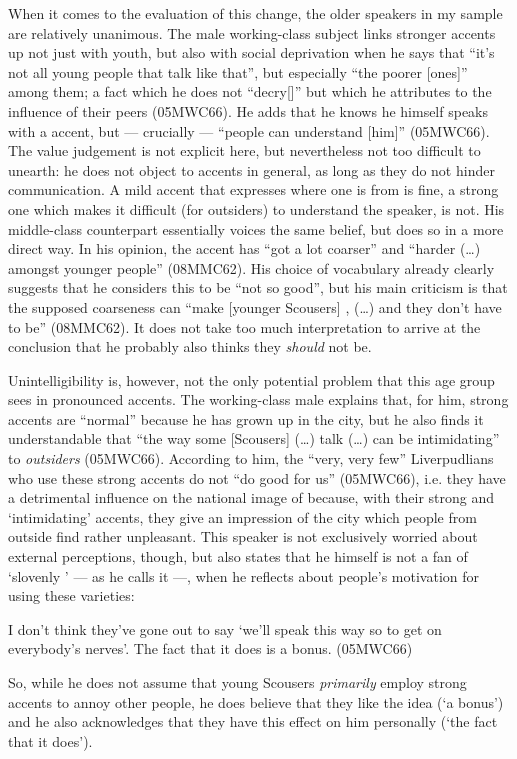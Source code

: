 When it comes to the evaluation of this change, the older speakers in my sample are relatively unanimous.
The male working-class subject links stronger accents up not just with youth, but also with social deprivation when he says that ``it's not all young people that talk like that'', but especially ``the poorer [ones]'' among them; a fact which he does not ``decry[]'' but which he attributes to the influence of their peers (05MWC66).
He adds that he knows he himself speaks with a  accent, but --- crucially --- ``people can understand [him]'' (05MWC66).
The value judgement is not explicit here, but nevertheless not too difficult to unearth: he does not object to  accents in general, as long as they do not hinder communication.
A mild accent that expresses where one is from is fine, a strong one which makes it difficult (for outsiders) to understand the speaker, is not.
His middle-class counterpart essentially voices the same belief, but does so in a more direct way.
In his opinion, the accent has ``got a lot coarser'' and ``harder (\ldots) amongst younger people'' (08MMC62).
His choice of vocabulary already clearly suggests that he considers this to be ``not so good'', but his main criticism is that the supposed coarseness can ``make [younger Scousers] , (\ldots) and they don't have to be'' (08MMC62).
It does not take too much interpretation to arrive at the conclusion that he probably also thinks they \emph{should} not be.

Unintelligibility is, however, not the only potential problem that this age group sees in pronounced  accents.
The working-class male explains that, for him, strong  accents are ``normal'' because he has grown up in the city, but he also finds it understandable that ``the way some [Scousers] (\ldots) talk (\ldots) can be intimidating'' to \emph{outsiders} (05MWC66).
According to him, the ``very, very few'' Liverpudlians who use these strong accents do not ``do good for us'' (05MWC66), i.e. they have a detrimental influence on the national image of  because, with their strong and `intimidating' accents, they give an impression of the city which people from outside find rather unpleasant.
This speaker is not exclusively worried about external perceptions, though, but also states that he himself is not a fan of `slovenly ' --- as he calls it ---, when he reflects about people's motivation for using these varieties: 
\begin{example}
	I don't think they've  gone out to say `we'll speak this way so to get on everybody's nerves'. The fact that it does is a bonus. (05MWC66)
\end{example}
So, while he does not assume that young Scousers \emph{primarily} employ strong accents to annoy other people, he does believe that they like the idea (`a bonus') and he also acknowledges that they have this effect on him personally (`the fact that it does').

